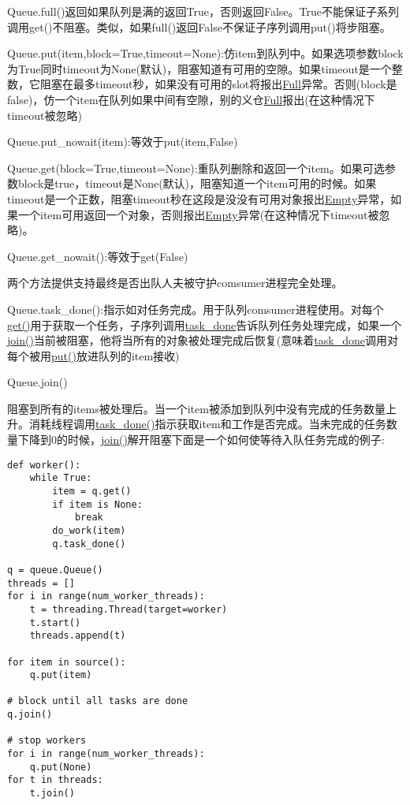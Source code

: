 Queue.full()返回如果队列是满的返回True，否则返回False。True不能保证子系列调用get()不阻塞。类似，如果full()返回False不保证子序列调用put()将步阻塞。


Queue.put(item,block=True,timeout=None):仿item到队列中。如果选项参数block为True同时timeout为None(默认)，阻塞知道有可用的空隙。如果timeout是一个整数，它阻塞在最多timeout秒，如果没有可用的slot将报出\href{}{Full}异常。否则(block是false)，仿一个item在队列如果中间有空隙，别的义仓\href{}{Full}报出(在这种情况下timeout被忽略)

Queue.put\_nowait(item):等效于put(item,False)

Queue.get(block=True,timeout=None):重队列删除和返回一个item。如果可选参数block是true，timeout是None(默认)，阻塞知道一个item可用的时候。如果timeout是一个正数，阻塞timeout秒在这段是没没有可用对象报出\href{}{Empty}异常，如果一个item可用返回一个对象，否则报出\href{}{Empty}异常(在这种情况下timeout被忽略)。

Queue.get\_nowait():等效于get(False)

两个方法提供支持最终是否出队人夫被守护comsumer进程完全处理。

Queue.task\_done():指示如对任务完成。用于队列comsumer进程使用。对每个\href{}{get()}用于获取一个任务，子序列调用\href{}{task\_done}告诉队列任务处理完成，如果一个\href{}{join()}当前被阻塞，他将当所有的对象被处理完成后恢复(意味着\href{}{task\_done}调用对每个被用\href{}{put()}放进队列的item接收)

Queue.join()

阻塞到所有的items被处理后。当一个item被添加到队列中没有完成的任务数量上升。消耗线程调用\href{}{task\_done()}指示获取item和工作是否完成。当未完成的任务数量下降到0的时候，\href{}{join()}解开阻塞下面是一个如何使等待入队任务完成的例子:
\begin{verbatim}
def worker():
    while True:
        item = q.get()
        if item is None:
            break
        do_work(item)
        q.task_done()

q = queue.Queue()
threads = []
for i in range(num_worker_threads):
    t = threading.Thread(target=worker)
    t.start()
    threads.append(t)

for item in source():
    q.put(item)

# block until all tasks are done
q.join()

# stop workers
for i in range(num_worker_threads):
    q.put(None)
for t in threads:
    t.join()
\end{verbatim}













